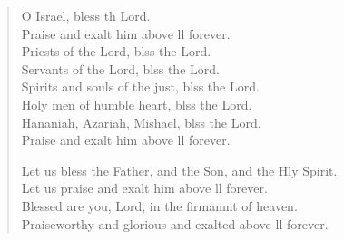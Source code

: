 \begin{verse}
\begin{patverse}
O Israel, bless th Lord.\Med\\
Praise and exalt him above ll forever.\\
Priests of the Lord, blss the Lord.\Med\\
Servants of the Lord, blss the Lord.\\
Spirits and souls of the just, blss the Lord.\Med\\
Holy men of humble heart, blss the Lord.\\
Hananiah, Azariah, Mishael, blss the Lord.\Med\\
Praise and exalt him above ll forever.

Let us bless the Father, and the Son, and the Hly Spirit.\Med\\
Let us praise and exalt him above ll forever.\\
Blessed are you, Lord, in the firmamnt of heaven.\Med\\
Praiseworthy and glorious and exalted above ll forever.
  \end{patverse}
\end{verse}
